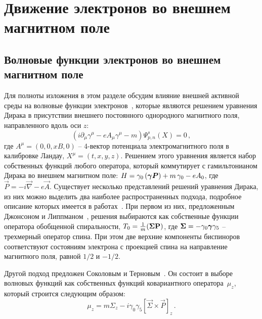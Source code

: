 \section{Движение электронов во внешнем магнитном поле}\label{Ch:Fermion}
\subsection{Волновые функции электронов во внешнем магнитном поле}
Для полноты изложения в этом разделе обсудим влияние внешней активной среды на 
волновые функции электронов~\cite{KM_Book_2013}, которые являются решением 
уравнения Дирака в присутствии внешнего постоянного однородного магнитного 
поля, направленного вдоль оси $z$:
\begin{equation}\label{eq:Dirac}
	(i\partial_\mu \gamma^\mu -e A_\mu \gamma^\mu - m) \Psi^s_{p,n}(X)=0\, ,
\end{equation}
где  $A^\mu=\left(0,0,xB,0\right)$ -- 
4-вектор потенциала электромагнитного поля в калибровке 
Ландау, $X^\mu=\left(t,x,y,z\right)$. Решением этого уравнения является набор собственных функций любого оператора, который 
коммутирует с гамильтонианом Дирака во внешнем магнитном поле: $H = \gamma_0 
\left( {\boldsymbol \gamma} {\boldsymbol P} \right) + m \, \gamma_0 -e A_0$, где $\vec{P} 
= -i \vec{\nabla} -e \vec{A}$. Существует несколько представлений решений 
уравнения Дирака, из них можно выделить два наиболее распространенных подхода, 
подробное описание которых имеется в 
работах~\cite{Melrose:1983,Sokolov:1986,Kuznetsov:2003,Bhattacharya:2004,Balantsev:2011,KM_Book_2013}.
 При первом из них, предложенным Джонсоном и Липпманом~\cite{Johnson:1949}, 
решения выбираются как собственные функции оператора обобщенной спиральности, 
$T_0 = \frac{1}{m} (\boldsymbol\Sigma \mathbf{P})$, где $\boldsymbol\Sigma = - \gamma_0 
\boldsymbol\gamma \gamma_5$  -- трехмерный оператор спина. При этом две верхние 
компоненты биспиноров соответствуют состояниям электрона с проекцией спина на 
направление магнитного поля, равной $1/2$ и   $-1/2$.

Другой подход предложен Соколовым и Терновым~\cite{Sokolov:1968}. Он состоит в выборе волновых функций как собственных функций ковариантного оператора~$\mu_z$, который строится следующим образом: 
\begin{equation}\label{eq:muz}
	\mu_z=m \Sigma_z - i \gamma_0\gamma_5\left[\vec{\Sigma}\times 
	\vec{P}\right]_z\, .
\end{equation}

